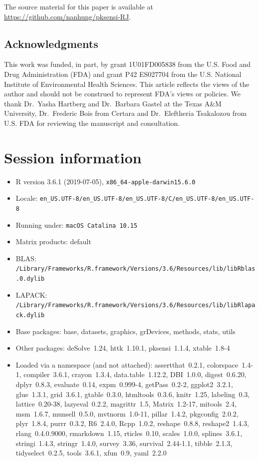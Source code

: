 The source material for this paper is available at
\url{https://github.com/nanhung/pksensi-RJ}.

\hypertarget{acknowledgments}{%
\subsection{Acknowledgments}\label{acknowledgments}}

This work was funded, in part, by grant 1U01FD005838 from the U.S. Food
and Drug Administration (FDA) and grant P42 ES027704 from the U.S.
National Institute of Environmental Health Sciences. This article
reflects the views of the author and should not be construed to
represent FDA's views or policies. We thank Dr.~Yasha Hartberg and
Dr.~Barbara Gastel at the Texas A\&M University, Dr.~Frederic Bois from
Certara and Dr.~Eleftheria Tsakalozou from U.S. FDA for reviewing the
manuscript and consultation.

\hypertarget{session-information}{%
\section{Session information}\label{session-information}}

\begin{itemize}\raggedright
  \item R version 3.6.1 (2019-07-05), \verb|x86_64-apple-darwin15.6.0|
  \item Locale: \verb|en_US.UTF-8/en_US.UTF-8/en_US.UTF-8/C/en_US.UTF-8/en_US.UTF-8|
  \item Running under: \verb|macOS Catalina 10.15|
  \item Matrix products: default
  \item BLAS:   \verb|/Library/Frameworks/R.framework/Versions/3.6/Resources/lib/libRblas.0.dylib|
  \item LAPACK: \verb|/Library/Frameworks/R.framework/Versions/3.6/Resources/lib/libRlapack.dylib|
  \item Base packages: base, datasets, graphics, grDevices,
    methods, stats, utils
  \item Other packages: deSolve~1.24, httk~1.10.1, pksensi~1.1.4,
    xtable~1.8-4
  \item Loaded via a namespace (and not attached):
    assertthat~0.2.1, colorspace~1.4-1, compiler~3.6.1,
    crayon~1.3.4, data.table~1.12.2, DBI~1.0.0, digest~0.6.20,
    dplyr~0.8.3, evaluate~0.14, expm~0.999-4, getPass~0.2-2,
    ggplot2~3.2.1, glue~1.3.1, grid~3.6.1, gtable~0.3.0,
    htmltools~0.3.6, knitr~1.25, labeling~0.3, lattice~0.20-38,
    lazyeval~0.2.2, magrittr~1.5, Matrix~1.2-17, mitools~2.4,
    msm~1.6.7, munsell~0.5.0, mvtnorm~1.0-11, pillar~1.4.2,
    pkgconfig~2.0.2, plyr~1.8.4, purrr~0.3.2, R6~2.4.0,
    Rcpp~1.0.2, reshape~0.8.8, reshape2~1.4.3, rlang~0.4.0.9000,
    rmarkdown~1.15, rticles~0.10, scales~1.0.0, splines~3.6.1,
    stringi~1.4.3, stringr~1.4.0, survey~3.36, survival~2.44-1.1,
    tibble~2.1.3, tidyselect~0.2.5, tools~3.6.1, xfun~0.9,
    yaml~2.2.0
\end{itemize}

